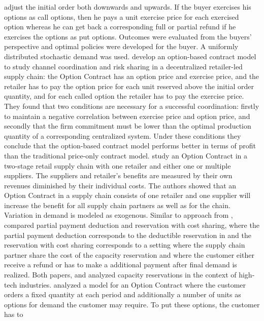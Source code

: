 \documentclass[12pt,english]{article}
\begin{document}
adjust the initial order both downwards and upwards. If the buyer
exercises his options as call options, then he pays a unit exercise
price for each exercised option whereas he can get back a corresponding
full or partial refund if he exercises the options as put options.
Outcomes were evaluated from the buyers\textquoteright{} perspective
and optimal policies were developed for the buyer. A uniformly distributed
stochastic demand was used. \citet{Wang2007} develop an option-based
contract model to study channel coordination and risk sharing in a
decentralized retailer-led supply chain: the Option Contract has an
option price and exercise price, and the retailer has to pay the option
price for each unit reserved above the initial order quantity, and
for each called option the retailer has to pay the exercise price.
They found that two conditions are necessary for a successful coordination:
firstly to maintain a negative correlation between exercise price
and option price, and secondly that the firm commitment must be lower
than the optimal production quantity of a corresponding centralized
system. Under these conditions they conclude that the option-based
contract model performs better in terms of profit than the traditional
price-only contract model. \citet{Gomez-Padilla2009} study an Option
Contract in a two-stage retail supply chain with one retailer and
either one or multiple suppliers. The suppliers and retailer\textquoteright s
benefits are measured by their own revenues diminished by their individual
costs. The authors showed that an Option Contract in a supply chain
consists of one retailer and one supplier will increase the benefit
for all supply chain partners as well as for the chain. Variation
in demand is modeled as exogenous. Similar to approach from \citet{Gomez-Padilla2009},
\citet{M.Erkoc2005} compared partial payment deduction and reservation
with cost sharing, where the partial payment deduction corresponds
to the deductible reservation in \citet{Gomez-Padilla2009} and the
reservation with cost sharing corresponds to a setting where the supply
chain partner share the cost of the capacity reservation and where
the customer either receive a refund or has to make a additional payment
after final demand is realized. Both papers, \citet{Gomez-Padilla2009}
and \citet{M.Erkoc2005} analyzed capacity reservations in the context
of high-tech industries. \citet{BassokAndAnupindi1997} analyzed a
model for an Option Contract where the customer orders a fixed quantity
at each period and additionally a number of units as options for demand
the customer may require. To put these options, the customer has to
\end{document}
